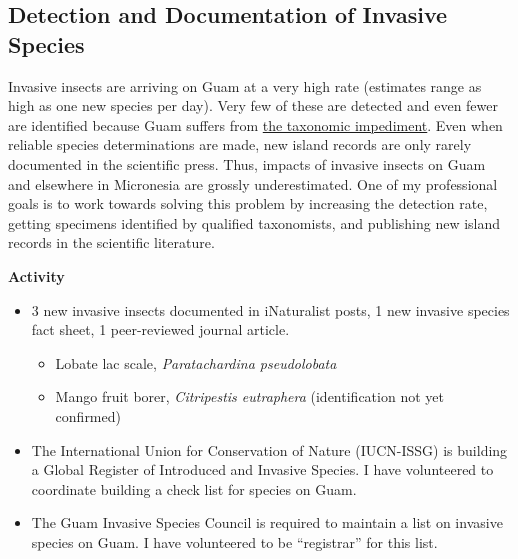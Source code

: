 \documentclass[12pt,english]{scrartcl}
\begin{document}
\subsection{Detection and Documentation of Invasive Species}
\begin{refsection}

Invasive insects are arriving on Guam at a very high rate (estimates
range as high as one new species per day). Very few of these are detected
and even fewer are identified because Guam suffers from \href{https://en.wikipedia.org/wiki/Taxonomic_impediment}{the taxonomic impediment}.
Even when reliable species determinations are made, new island records
are only rarely documented in the scientific press. Thus, impacts
of invasive insects on Guam and elsewhere in Micronesia are grossly
underestimated. One of my professional goals is to work towards solving
this problem by increasing the detection rate, getting specimens identified
by qualified taxonomists, and publishing new island records in the
scientific literature.

\raggedright\vspace{2mm}\textbf{Activity}

\begin{itemize}
\item 3 new invasive insects documented in iNaturalist posts, 1 new invasive
species fact sheet, 1 peer-reviewed journal article.

\begin{itemize}

\item Lobate lac scale, \emph{Paratachardina pseudolobata} %
\cite{moore_lobate_2018}

\item Mango fruit borer, \emph{Citripestis eutraphera} (identification not
yet confirmed)~\cite{moore_citripestis_2018, moore_citripestis_2018-1}
\end{itemize}

\item The International Union for Conservation of Nature (IUCN-ISSG) is
building a Global Register of Introduced and Invasive Species. I have
volunteered to coordinate building a check list for species on Guam.

\item The Guam Invasive Species Council is required to maintain a list on
invasive species on Guam. I have volunteered to be ``registrar''
for this list.

\end{itemize}

\printbibliography
\end{refsection}
\end{document}
